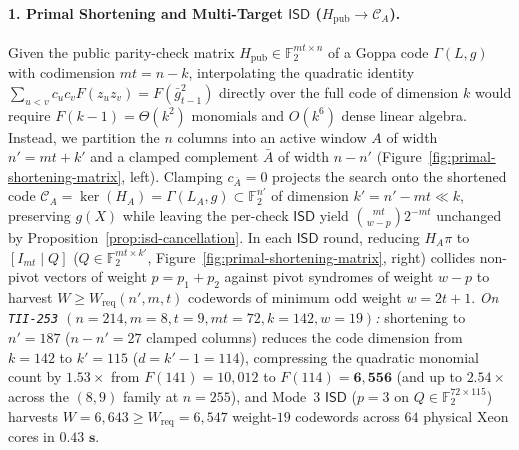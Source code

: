 \documentclass[11pt,a4paper]{article}
\theoremstyle{definition}
\theoremstyle{remark}
\newcommand{\F}{\mathbb{F}}
\newcommand{\ISD}{\mathsf{ISD}}
\begin{document}
\paragraph{1. Primal Shortening and Multi-Target $\ISD$ ($H_{\text{pub}} \to \mathcal{C}_A$).}
Given the public parity-check matrix $H_{\text{pub}} \in \F_2^{mt \times n}$ of a Goppa code $\Gamma(L, g)$ with codimension $mt = n - k$, interpolating the quadratic identity $\sum_{u < v} c_u c_v F(z_u z_v) = F(\bar{g}_{t-1}^2)$ directly over the full code of dimension $k$ would require $F(k - 1) = \Theta(k^2)$ monomials and $O(k^6)$ dense linear algebra. Instead, we partition the $n$ columns into an active window $A$ of width $n' = mt + k'$ and a clamped complement $\bar{A}$ of width $n - n'$ (Figure~\ref{fig:primal-shortening-matrix}, left). Clamping $c_{\bar{A}} = 0$ projects the search onto the shortened code $\mathcal{C}_A = \ker(H_A) = \Gamma(L_A, g) \subset \F_2^{n'}$ of dimension $k' = n' - mt \ll k$, preserving $g(X)$ while leaving the per-check $\ISD$ yield $\binom{mt}{w-p} 2^{-mt}$ unchanged by Proposition~\ref{prop:isd-cancellation}. In each $\ISD$ round, reducing $H_A \pi$ to $[I_{mt} \mid Q]$ ($Q \in \F_2^{mt \times k'}$, Figure~\ref{fig:primal-shortening-matrix}, right) collides non-pivot vectors of weight $p = p_1 + p_2$ against pivot syndromes of weight $w - p$ to harvest $W \ge W_{\text{req}}(n', m, t)$ codewords of minimum odd weight $w = 2t + 1$.
\emph{On \texttt{TII-253} $(n = 214, m = 8, t = 9, mt = 72, k = 142, w = 19)$:} shortening to $n' = 187$ ($n - n' = 27$ clamped columns) reduces the code dimension from $k = 142$ to $k' = 115$ ($d = k' - 1 = 114$), compressing the quadratic monomial count by $\mathbf{1.53\times}$ from $F(141) = 10{,}012$ to $F(114) = \mathbf{6{,}556}$ (and up to $2.54\times$ across the $(8, 9)$ family at $n = 255$), and Mode~3 $\ISD$ ($p = 3$ on $Q \in \F_2^{72 \times 115}$) harvests $W = 6{,}643 \ge W_{\text{req}} = 6{,}547$ weight-$19$ codewords across $64$ physical Xeon cores in $\mathbf{0.43\text{ s}}$.
\end{document}
